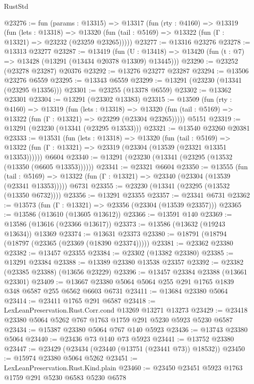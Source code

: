 \begin{lexlean}{RustStd}
\begin{coremodule}
@23276 := fun (params : @13315) =>
  @13317
    (fun (rty : @4160) =>
    @13319
      (fun (lets : @13318) =>
      @13320 (fun (tail : @5169) => @13322 (fun (Γ : @13321) => @23232 (@23259 @23265)))))
@23277 := @13316 @23276
@23278 := @13313 @23277
@23287 := @13419
    (fun (U : @13418) => @13420 (fun (t : @7) => @13428 (@13291 (@13434 @20378 @13309) @13445)))
@23290 := @23252 (@23278 @23287) @20376
@23292 := @13276 @23277 @23287
@23294 := @13506 @23276 @6559
@23295 := @13343 @6559
@23299 := @13291 (@23230 (@13341 (@23295 @13356)))
@23301 := @23255 (@13378 @6559)
@23302 := @13362 @23301
@23304 := @13291 (@23302 @13383)
@23315 := @13509
    (fun (rty : @4160) =>
    @13319
      (fun (lets : @13318) =>
      @13320 (fun (tail : @5169) => @13322 (fun (Γ : @13321) => @23299 (@23304 @23265)))))
    @5151
@23319 := @13291 (@23230 (@13341 (@23295 @13533)))
@23321 := @13540 @23260 @20381
@23333 := @13531
    (fun (lets : @13318) =>
    @13320
      (fun (tail : @5169) =>
      @13322 (fun (Γ : @13321) => @23319 (@23304 (@13539 (@23321 @13351 @13353))))))
    @6604
@23340 := @13291 (@23230 (@13341 (@23295 (@13532 (@13350 (@6605 @13353))))))
@23341 := @23321 @6604
@23350 := @13555
    (fun (tail : @5169) => @13322 (fun (Γ : @13321) => @23340 (@23304 (@13539 (@23341 @13353)))))
    @6731
@23355 := @23230 (@13341 (@23295 (@13532 (@13350 @6732))))
@23356 := @13291 @23355
@23357 := @23341 @6731
@23362 := @13573 (fun (Γ : @13321) => @23356 (@23304 (@13539 @23357)))
@23365 := @13586 (@13610 (@13605 @13612))
@23366 := @13591 @140
@23369 := @13586 (@13616 (@23366 @13617))
@23373 := @13586 (@13632 (@19243 @13634)) @13369
@23374 := @13631 @23373
@23380 := @18791 (@18794 (@18797 (@23365 (@23369 (@18390 @23374)))))
@23381 := @23362 @23380
@23382 := @13457 @23355
@23384 := @23302 (@13382 @23380)
@23385 := @13291 @23384
@23388 := @13389 @23380 @13538 @23357
@23392 := @23382 (@23385 @23388) (@13656 @23229)
@23396 := @13457 @23384 @23388 (@13661 @23301)
@23409 := @13667 @23380 @5064 @5064 @255 @291 @1765 @1839 @348 @6587 @255 @6562 @6603 @6731
@23411 := @13684 @23380 @5064
@23414 := @23411 @1765 @291 @6587
@23418 := LexLeanPreservation.Rust.Corr.cond @13269 @13271 @13273
@23429 := @23418 @23380 @5064 @5262 @767 @1763 @1759 @291 @5230 @5923 @5230 @6587
@23434 := @15387 @23380 @5064 @767 @140 @5923
@23436 := @13743 @23380 @5064
@23440 := @23436 @73 @140 @73 @5923
@23441 := @13752 @23380
@23447 := @23429 (@23434 (@23440 (@13751 (@23441 @73)) @18532))
@23450 := @15974 @23380 @5064 @5262
@23451 := LexLeanPreservation.Rust.Kind.plain
@23460 := @23450 @23451 @5923 @1763 @1759 @291 @5230 @6583 @5230 @6578

\end{coremodule}
\end{lexlean}
